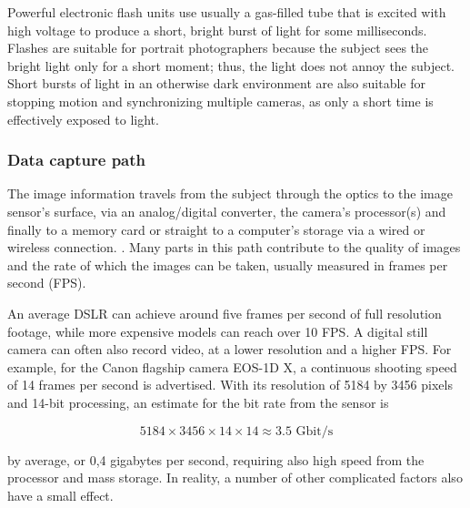 Powerful electronic flash units use usually a gas-filled tube that is excited with high voltage to produce a short, bright burst of light for some milliseconds.
Flashes are suitable for portrait photographers because the subject sees the bright light only for a short moment; thus, the light does not annoy the subject.
Short bursts of light in an otherwise dark environment are also suitable for stopping motion and synchronizing multiple cameras, as only a short time is effectively exposed to light.
\cite{langford2000basic}





\subsubsection{Data capture path} %

The image information travels from the subject through the optics to the image sensor's surface, via an analog/digital converter, the camera's processor(s) and finally to a memory card or straight to a computer's storage via a wired or wireless connection.
\cite{szeliski10vision}.
Many parts in this path contribute to the quality of images and the rate of which the images can be taken, usually measured in frames per second (FPS).


An average DSLR can achieve around five frames per second of full resolution footage, while more expensive models can reach over 10 FPS.
A digital still camera can often also record video, at a lower resolution and a higher FPS.
For example, for the Canon flagship camera EOS-1D X, a continuous shooting speed of 14 frames per second is advertised. \cite{eos1dx}
With its resolution of 5184 by 3456 pixels and 14-bit processing, an estimate for the bit rate from the sensor is

\begin{equation} \label{eq:eos1dspeed}
5184 \times 3456 \times 14 \times 14 \approx 3.5\text{ Gbit/s}
\end{equation}

by average, or 0,4 gigabytes per second, requiring also high speed from the processor and mass storage.
In reality, a number of other complicated factors also have a small effect.

